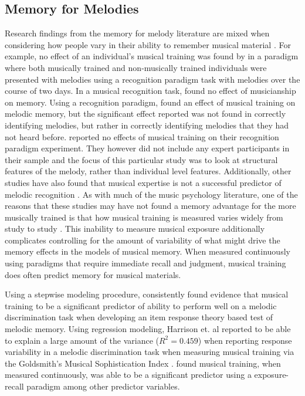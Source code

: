 \documentclass[]{book}
\begin{document}
\hypertarget{memory-for-melodies}{%
\subsection{Memory for Melodies}\label{memory-for-melodies}}

Research findings from the memory for melody literature are mixed when considering how people vary in their ability to remember musical material \citep{halpernMemoryMelodies2010}.
For example, no effect of an individual's musical training was found by \citet{mcauleyPlayItAgain2004} in a paradigm where both musically trained and non-musically trained individuals were presented with melodies using a recognition paradigm task with melodies over the course of two days.
In a musical recognition task, \citet{korenmanRoleFamiliarityEpisodic2004} found no effect of musicianship on memory.
Using a recognition paradigm, \citet{munganLevelsofProcessingEffectsRemember2011} found an effect of musical training on melodic memory, but the significant effect reported was not found in correctly identifying melodies, but rather in correctly identifying melodies that they had not heard before.
\citet{mullensiefenRoleFeaturesContext2014} reported no effects of musical training on their recognition paradigm experiment.
They however did not include any expert participants in their sample and the focus of this particular study was to look at structural features of the melody, rather than individual level features.
Additionally, other studies have also found that musical expertise is not a successful predictor of melodic recognition \citep{demorestLostTranslationEnculturation2008, halpernAgingExperienceRecognition1995}.
As with much of the music psychology literature, one of the reasons that these studies may have not found a memory advantage for the more musically trained is that how musical training is measured varies widely from study to study \citep{talaminiMusiciansHaveBetter2017}.
This inability to measure musical exposure additionally complicates controlling for the amount of variability of what might drive the memory effects in the models of musical memory.
When measured continuously using paradigms that require immediate recall and judgment, musical training does often predict memory for musical materials.

Using a stepwise modeling procedure, \citet{harrisonModellingMelodicDiscrimination2016} consistently found evidence that musical training to be a significant predictor of ability to perform well on a melodic discrimination task when developing an item response theory based test of melodic memory.
Using regression modeling, Harrison et. al reported to be able to explain a large amount of the variance (\(R^2 = 0.459\)) when reporting response variability in a melodic discrimination task \citep{harrisonApplyingModernPsychometric2017a} when measuring musical training via the Goldsmith's Musical Sophistication Index \citep{mullensiefenMusicalityNonMusiciansIndex2014}.
\citet{bakerPerceptionLeitmotivesRichard2017} found musical training, when measured continuously, was able to be a significant predictor using a exposure-recall paradigm among other predictor variables.
\end{document}
